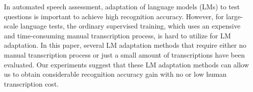 In automated speech assessment, adaptation of language models (LMs) to test questions is important to achieve high recognition accuracy. However, for
 large-scale language tests, the ordinary supervised training, which uses an
 expensive and time-consuming manual transcription process, is hard to utilize
 for LM adaptation. In this paper, several LM adaptation methods that require
 either no manual transcription process or just a small amount of transcriptions
 have been evaluated. Our experiments suggest that these LM adaptation methods
 can allow us to obtain considerable recognition accuracy gain with no or low
 human transcription cost.

